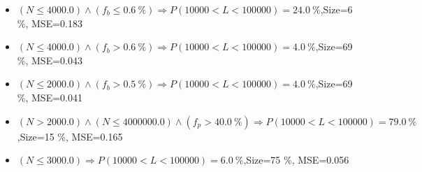 \documentclass[numbered]{CSL}
\begin{document}
\begin{itemize}
\item $(N \leq 4000.0) \land (f_b \leq 0.6~\%) \Rightarrow P(10 000 < L < 100 000) = 24.0~\%$,\hfill Size=6 \%, MSE=0.183
\item $(N \leq 4000.0) \land (f_b > 0.6~\%) \Rightarrow P(10 000 < L < 100 000) = 4.0~\%$,\hfill Size=69 \%, MSE=0.043
\item $(N \leq 2000.0) \land (f_b > 0.5~\%) \Rightarrow P(10 000 < L < 100 000) = 4.0~\%$,\hfill Size=69 \%, MSE=0.041
\item $(N > 2000.0) \land (N \leq 4000000.0) \land (f_p > 40.0~\%) \Rightarrow P(10 000 < L < 100 000) = 79.0~\%$,\hfill Size=15 \%, MSE=0.165
\item $(N \leq 3000.0) \Rightarrow P(10 000 < L < 100 000) = 6.0~\%$,\hfill Size=75 \%, MSE=0.056
\end{itemize}
\end{document}
